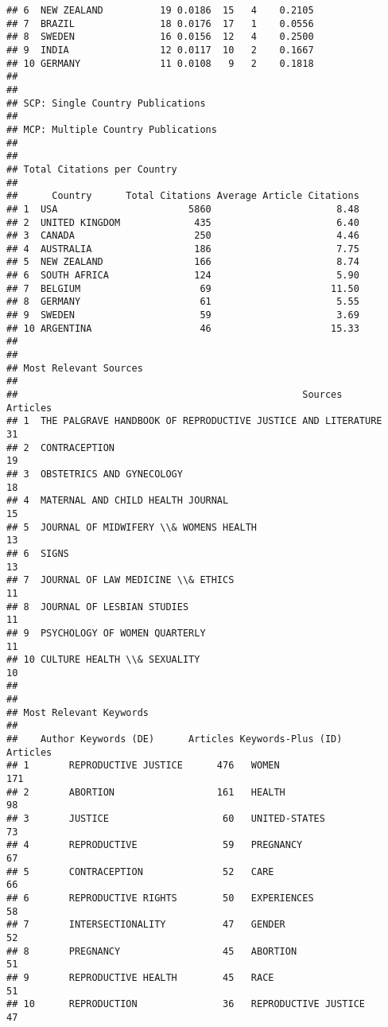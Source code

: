 \documentclass[
]{article}
\begin{document}
\begin{verbatim}
## 6  NEW ZEALAND          19 0.0186  15   4    0.2105
## 7  BRAZIL               18 0.0176  17   1    0.0556
## 8  SWEDEN               16 0.0156  12   4    0.2500
## 9  INDIA                12 0.0117  10   2    0.1667
## 10 GERMANY              11 0.0108   9   2    0.1818
## 
## 
## SCP: Single Country Publications
## 
## MCP: Multiple Country Publications
## 
## 
## Total Citations per Country
## 
##      Country      Total Citations Average Article Citations
## 1  USA                       5860                      8.48
## 2  UNITED KINGDOM             435                      6.40
## 3  CANADA                     250                      4.46
## 4  AUSTRALIA                  186                      7.75
## 5  NEW ZEALAND                166                      8.74
## 6  SOUTH AFRICA               124                      5.90
## 7  BELGIUM                     69                     11.50
## 8  GERMANY                     61                      5.55
## 9  SWEDEN                      59                      3.69
## 10 ARGENTINA                   46                     15.33
## 
## 
## Most Relevant Sources
## 
##                                                  Sources        Articles
## 1  THE PALGRAVE HANDBOOK OF REPRODUCTIVE JUSTICE AND LITERATURE       31
## 2  CONTRACEPTION                                                      19
## 3  OBSTETRICS AND GYNECOLOGY                                          18
## 4  MATERNAL AND CHILD HEALTH JOURNAL                                  15
## 5  JOURNAL OF MIDWIFERY \\& WOMENS HEALTH                             13
## 6  SIGNS                                                              13
## 7  JOURNAL OF LAW MEDICINE \\& ETHICS                                 11
## 8  JOURNAL OF LESBIAN STUDIES                                         11
## 9  PSYCHOLOGY OF WOMEN QUARTERLY                                      11
## 10 CULTURE HEALTH \\& SEXUALITY                                       10
## 
## 
## Most Relevant Keywords
## 
##    Author Keywords (DE)      Articles Keywords-Plus (ID)     Articles
## 1       REPRODUCTIVE JUSTICE      476   WOMEN                     171
## 2       ABORTION                  161   HEALTH                     98
## 3       JUSTICE                    60   UNITED-STATES              73
## 4       REPRODUCTIVE               59   PREGNANCY                  67
## 5       CONTRACEPTION              52   CARE                       66
## 6       REPRODUCTIVE RIGHTS        50   EXPERIENCES                58
## 7       INTERSECTIONALITY          47   GENDER                     52
## 8       PREGNANCY                  45   ABORTION                   51
## 9       REPRODUCTIVE HEALTH        45   RACE                       51
## 10      REPRODUCTION               36   REPRODUCTIVE JUSTICE       47
\end{verbatim}
\end{document}
